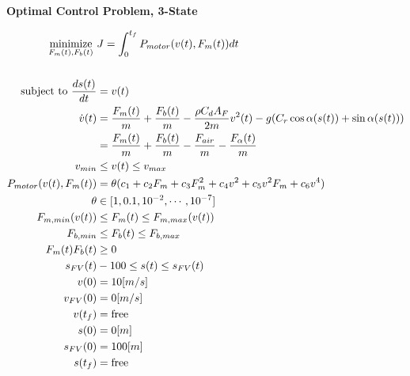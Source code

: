\documentclass[a4paper]{article}
\begin{document}
	
	\textbf{Optimal Control Problem, 3-State}
	
	\begin{align}
		\underset{F_m(t),F_b(t)}{\mbox{minimize}} \ & J = \int_{0}^{t_f} P_{motor}(v(t),F_{m}(t))dt \\ \\
		\mbox{subject to} \
		{ds(t)\over dt} & = v(t) \\
		\dot{v}(t) & = {F_m(t)\over m}+{F_b(t)\over m}-{\rho C_d A_F \over 2m}v^2(t) - g(C_r \cos{\alpha(s(t))} + \sin{\alpha (s(t))}) \\
		& = {F_m(t) \over m} + {F_b(t) \over m} - {F_{air} \over m} - {F_\alpha (t) \over m} \\
		v_{min} &\le v(t) \le v_{max} \\
		P_{motor}(v(t),F_m(t)) & = \theta(c_1+c_2F_m+c_3F_m^2+c_4v^2+c_5v^2F_m+c_6v^4)\\
		\theta & \in [1, 0.1, 10^{-2}, \cdots,10^{-7}]\\
		F_{m,min}(v(t)) &\le F_m(t) \le F_{m,max}(v(t)) \\
		F_{b,min} &\le F_b(t) \le F_{b,max} \\
		F_m(t)F_b(t) &\ge 0 \\
		s_{FV}(t) &-100 \le s(t) \le s_{FV}(t) \\
		v(0) &= 10[m/s] \\
		v_{FV}(0) & = 0[m/s] \\
		v(t_f)& = \text{free} \\
		s(0) & = 0[m] \\
		s_{FV}(0) & = 100[m] \\
		s(t_f) & = \text{free}
	\end{align}
	
\end{document}
